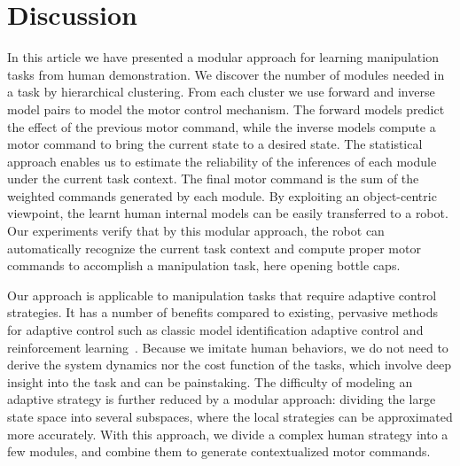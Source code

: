 \section{Discussion}
\label{sec:diss}


In this article we have presented a modular approach for learning
manipulation tasks from human demonstration. We discover the number of
modules needed in a task by hierarchical clustering. From each cluster
we use forward and inverse model pairs to model the motor control
mechanism. The forward models predict the effect of the previous motor
command, while the inverse models compute a motor command to bring the
current state to a desired state. The statistical approach enables us
to estimate the reliability of the inferences of each module under the
current task context. The final motor command is the sum of the weighted
commands generated by each module. By exploiting an object-centric
viewpoint, the learnt human internal models can be easily transferred
to a robot. Our experiments verify that by this modular approach, the
robot can automatically recognize the current task context and compute
proper motor commands to accomplish a manipulation task, here opening
bottle caps.


Our approach is applicable to manipulation tasks that require adaptive
control strategies. It has a number of benefits compared to existing,
pervasive methods for adaptive control such as classic model
identification adaptive control and reinforcement
learning~\cite{narendra1995adaptation,khalil2004modeling,buchli2011learning}. %
Because we imitate human behaviors, we do not need to derive the
system dynamics nor the cost function of the tasks, which involve deep
insight into the task and can be painstaking. The difficulty of
modeling an adaptive strategy is further reduced by a modular
approach: dividing the large state space into several subspaces, where
the local strategies can be approximated more accurately. With this
approach, we divide a complex human strategy into a few modules, and
combine them to generate contextualized motor commands.


